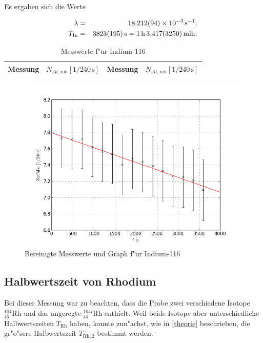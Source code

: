 		Es ergaben sich die Werte

		\begin{eqnarray}
			\lambda & = & \SI{18.212 (94)e-3}{\per \second} , \\
			T_\mathrm{In} & = & \SI{3823 (195)}{\second} = \SI{1}{\hour}\,\SI{3.417 (3250)}{\minute} .
		\end{eqnarray}

		\begin{table}
			\begin{center}
				\label{tabelle:indium}
				\caption{Messwerte f"ur Indium-116}
				\begin{tabular}{|c|c||c|c|}
					\hline 
					Messung & $N_{\Delta t, \mathrm{roh}}[1 / 240\,\mathrm{s}]$ & Messung & $N_{\Delta t, \mathrm{roh}}[1 / 240\,\mathrm{s}]$\\
					\hline 
					
					\hline 
				\end{tabular}
			\end{center}
		\end{table}

		\begin{figure}[!h]
			\centering
			\includegraphics[width = 15cm]{img/graph_indium_linearisiert.png}
			\caption{Bereinigte Messwerte und Graph f"ur Indium-116}
			\label{fig:indium}
		\end{figure}

	\newpage

	\subsection{Halbwertszeit von Rhodium}
		\label{subsec:rhodium}
		Bei dieser Messung war zu beachten, dass die Probe zwei verschiedene Isotope ${}_{45}^{104}\mathrm{Rh}$ und das angeregte ${}_{45}^{104i}\mathrm{Rh}$ enthielt.
		Weil beide Isotope aber unterschiedliche Halbwertszeiten $T_\mathrm{Rh}$ haben,
		konnte zun"achst, wie in \ref{theorie} beschrieben, die gr"o"sere Halbwertszeit $T_{\mathrm{Rh}, 2}$ bestimmt werden.

